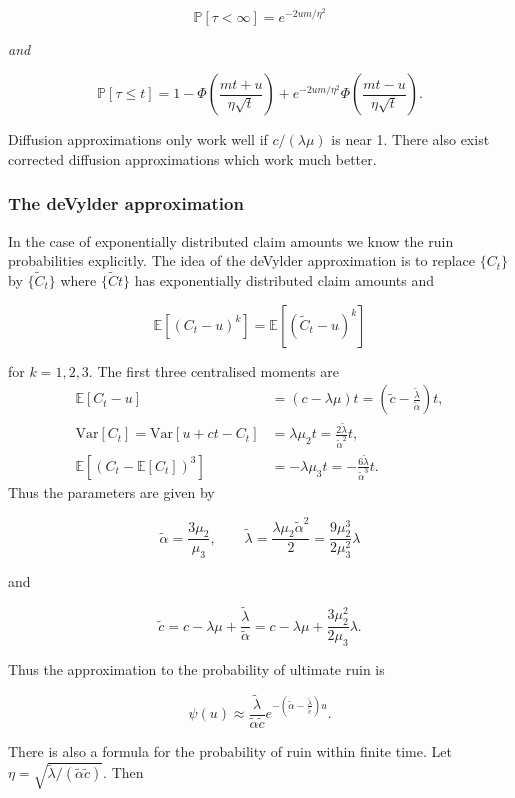 \documentclass[a4paper,12pt,openany]{book}
\begin{document}
\[
\mathbb P[\tau<\infty]=e^{-2um/\eta^2}
\]

\emph{and}

\[
\mathbb P[\tau\le t]=1-\Phi\left(\frac{mt+u}{\eta\sqrt t}\right)+e^{-2um/\eta^2}\Phi\left(\frac{mt-u}{\eta\sqrt t}\right).
\]

Diffusion approximations only work well if \(c/(\lambda \mu)\) is near 1. There also exist corrected diffusion approximations which work much better.

\hypertarget{the-devylder-approximation}{%
\subsubsection{The deVylder approximation}\label{the-devylder-approximation}}

In the case of exponentially distributed claim amounts we know the ruin probabilities explicitly. The idea of the deVylder approximation is to replace \(\{C_t\}\) by \(\{\tilde C_t\}\) where \(\{\tilde Ct\}\) has exponentially distributed claim amounts and

\[
\mathbb E [(C_t-u)^k]=\mathbb E [(\tilde C_t-u)^k]
\]

for \(k=1,2,3\). The first three centralised moments are
\begin{align*}
\mathbb E [C_t-u]&=(c-\lambda\mu)t=\left(\tilde c -\frac{\tilde \lambda}{\tilde \alpha}\right)t,\\
\text{Var}[C_t]=\text{Var}[u+ct-C_t]&=\lambda\mu_2t=\frac{2\tilde \lambda}{\tilde \alpha^2}t,\\
\mathbb E [(C_t-\mathbb E[C_t])^3]&=-\lambda\mu_3t=-\frac{6\tilde \lambda}{\tilde\alpha ^3}t.
\end{align*}
Thus the parameters are given by

\[
\tilde\alpha =\frac{3\mu_2}{\mu_3},\qquad\tilde\lambda=\frac{\lambda\mu_2\tilde \alpha^2}{2}=\frac{9\mu_2^3}{2\mu_3^2}\lambda
\]

and

\[
\tilde c=c-\lambda\mu+\frac{\tilde \lambda}{\tilde\alpha}=c-\lambda\mu+\frac{3\mu_2^2}{2\mu_3}\lambda.
\]

Thus the approximation to the probability of ultimate ruin is

\[
\psi(u)\approx \frac{\tilde \lambda}{\tilde\alpha\tilde c}e^{-\left(\tilde\alpha-\frac{\tilde \lambda}{\tilde c}\right)u}.
\]

There is also a formula for the probability of ruin within finite time. Let \(\eta =\sqrt{\tilde \lambda/(\tilde \alpha\tilde c)}\). Then
\end{document}
